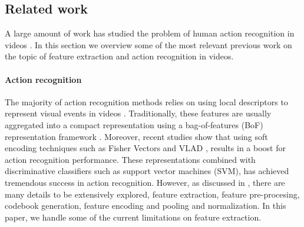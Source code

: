 \subsection{Related work}

A large amount of work has studied the problem of human action recognition in videos \cite{aggarwal2011}. In this section we overview some of the most relevant  previous work on the topic of feature extraction and action recognition in videos.

\paragraph{\textbf{Action recognition}}The majority of action recognition methods relies on using local descriptors to represent visual events in videos \cite{laptev2005,dollar2005,wang2011}. Traditionally, these features are usually aggregated into a compact representation using a bag-of-features (BoF) representation framework \cite{laptev2008}. Moreover, recent studies show that using soft encoding techniques such as  Fisher Vectors \cite{perronnin2010} and VLAD \cite{jegou2012}, results in a boost for action recognition performance. These representations combined with discriminative classifiers such as support vector machines (SVM), has achieved tremendous success in action recognition. However, as discussed in \cite{xwang2013}, there are many details to be extensively explored, \ie feature extraction, feature pre-procesing, codebook generation, feature encoding and pooling and normalization. In this paper, we handle some of the current limitations on feature extraction.

